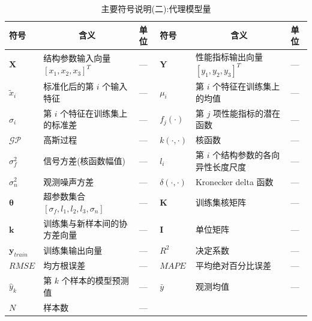 \begin{table}[H]
\centering
\small
\setlength{\tabcolsep}{2.5pt}
\caption{主要符号说明(二):代理模型量}
\begin{tabular}{>{\centering\arraybackslash}p{1.55cm}p{4.45cm}>{\centering\arraybackslash}p{1.35cm}>{\centering\arraybackslash}p{1.55cm}p{4.45cm}>{\centering\arraybackslash}p{1.35cm}}
\toprule
符号 & \multicolumn{1}{c}{含义} & 单位 & 符号 & \multicolumn{1}{c}{含义} & 单位 \\
\midrule
$\mathbf{X}$    & 结构参数输入向量 $[x_1, x_2, x_3]^T$ & — & $\mathbf{Y}$ & 性能指标输出向量 $[y_1, y_2, y_3]^T$ & — \\
$\tilde{x}_i$   & 标准化后的第 $i$ 个输入特征 & — & $\mu_i$      & 第 $i$ 个特征在训练集上的均值 & — \\
$\sigma_i$      & 第 $i$ 个特征在训练集上的标准差 & — & $f_j(\cdot)$ & 第 $j$ 项性能指标的潜在函数 & — \\
$\mathcal{GP}$  & 高斯过程 & — & $k(\cdot, \cdot)$ & 核函数 & — \\
$\sigma_f^2$    & 信号方差(核函数幅值) & — & $l_i$        & 第 $i$ 个结构参数的各向异性长度尺度 & — \\
$\sigma_n^2$    & 观测噪声方差 & — & $\delta(\cdot, \cdot)$ & Kronecker delta 函数 & — \\
$\boldsymbol{\theta}$ & 超参数集合 $[\sigma_f, l_1, l_2, l_3, \sigma_n]$ & — & $\mathbf{K}$ & 训练集核矩阵 & — \\
$\mathbf{k}$    & 训练集与新样本间的协方差向量 & — & $\mathbf{I}$ & 单位矩阵 & — \\
$\mathbf{y}_{train}$ & 训练集输出向量 & — & $R^2$        & 决定系数 & — \\
$RMSE$          & 均方根误差 & — & $MAPE$       & 平均绝对百分比误差 & — \\
$\hat{y}_k$     & 第 $k$ 个样本的模型预测值 & — & $\bar{y}$    & 观测均值 & — \\
$N$             & 样本数 & — & \multicolumn{3}{l}{} \\
\bottomrule
\end{tabular}
\end{table}


